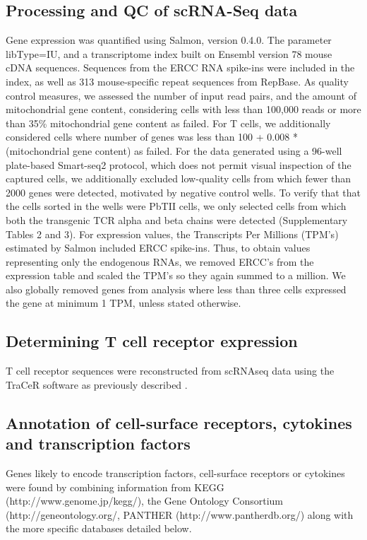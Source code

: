\subsection{Processing and QC of scRNA-Seq data}

Gene expression was quantified using Salmon, version 0.4.0. The parameter libType=IU, and a transcriptome index built on Ensembl version 78 mouse cDNA sequences. Sequences from the ERCC RNA spike-ins were included in the index, as well as 313 mouse-specific repeat sequences from RepBase. As quality control measures, we assessed the number of input read pairs, and the amount of mitochondrial gene content, considering cells with less than 100,000 reads or more than 35\% mitochondrial gene content as failed. For T cells, we additionally considered cells where number of genes was less than 100 + 0.008 * (mitochondrial gene content) as failed. For the data generated using a 96-well plate-based Smart-seq2 protocol, which does not permit visual inspection of the captured cells, we additionally excluded low-quality cells from which fewer than 2000 genes were detected, motivated by negative control wells. To verify that that the cells sorted in the wells were PbTII cells, we only selected cells from which both the transgenic TCR alpha and beta chains were detected (Supplementary Tables 2 and 3). For expression values, the Transcripts Per Millions (TPM's) estimated by Salmon included ERCC spike-ins. Thus, to obtain values representing only the endogenous RNAs, we removed ERCC's from the expression table and scaled the TPM's so they again summed to a million. We also globally removed genes from analysis where less than three cells expressed the gene at minimum 1 TPM, unless stated otherwise.

\subsection{Determining T cell receptor expression}

T cell receptor sequences were reconstructed from scRNAseq data using the TraCeR software as
previously described \cite{Stubbington2016-dt}.

\subsection{Annotation of cell-surface receptors, cytokines and transcription factors}

\begin{sloppypar}
Genes likely to encode transcription factors, cell-surface receptors or cytokines were found by combining information from KEGG (http://www.genome.jp/kegg/), the Gene Ontology Consortium (http://geneontology.org/, PANTHER (http://www.pantherdb.org/) along with the more specific databases detailed below.
\end{sloppypar}


